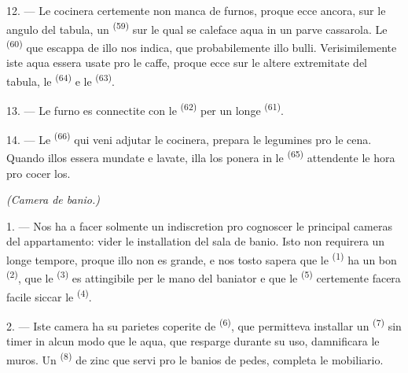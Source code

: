 12. --- Le cocinera certemente non manca de furnos, proque ecce ancora, sur le
angulo del tabula, un  \textsuperscript{(59)} sur le qual se
caleface aqua in un parve cassarola. Le  \textsuperscript{(60)}
que escappa de illo nos indica, que probabilemente illo bulli. Verisimilemente
iste aqua essera usate pro le caffe, proque ecce sur le altere extremitate del
tabula, le  \textsuperscript{(64)} e le  \textsuperscript{(63)}.

13. --- Le furno es connectite con le 
\textsuperscript{(62)} per un longe 
\textsuperscript{(61)}.

14. --- Le  \textsuperscript{(66)} qui veni adjutar
le cocinera, prepara le legumines pro le cena. Quando illos essera mundate e
lavate, illa los ponera in le  \textsuperscript{(65)}
attendente le hora pro cocer los.

\VUsaut{4.0mm}
{\centering\fontsize{10.2pt}{10.2pt}\selectfont{} \textit{(Camera de banio.)}\par}
\VUsaut{3.0mm}

1. --- Nos ha a facer solmente un indiscretion pro cognoscer le principal
cameras del appartamento: vider le installation del sala de banio. Isto non
requirera un longe tempore, proque illo non es grande, e nos tosto sapera que
le  \textsuperscript{(1)} ha un bon  \textsuperscript{(2)}, que le 
\textsuperscript{(3)} es attingibile per le mano del baniator e que le
 \textsuperscript{(5)} certemente facera facile siccar le
 \textsuperscript{(4)}.

2. --- Iste camera ha su parietes coperite de 
\textsuperscript{(6)}, que permitteva installar un 
\textsuperscript{(7)} sin timer in alcun modo que le aqua, que resparge durante
su uso, damnificara le muros. Un  \textsuperscript{(8)} de
zinc que servi pro le banios de pedes, completa le mobiliario.
\VUsaut{6.0mm}
\VUfilet{22mm}
